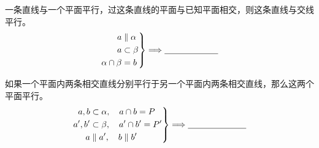 \documentclass{exam-zh}
\begin{document}
\begin{problem}[points=5]
  \noindent
  \begin{minipage}[t]{\dimexpr\linewidth-55mm-6mm\relax}
    \vspace{0pt}
    一条直线与一个平面平行，过这条直线的平面与已知平面相交，则这条直线与交线平行。
\[
\left.
\begin{aligned}
a&\parallel\alpha\\
a&\subset\beta\\
\alpha\cap\beta&=b
\end{aligned}
\right\}
\Longrightarrow
\underline{\hspace{22mm}}
\]


  \end{minipage}\hfill
  \begin{diagramcoltikz}{55mm}{}
  }
  \end{diagramcoltikz}
  \par\medskip
\end{problem}



\begin{problem}[points=5]
  \noindent
  \begin{minipage}[t]{\dimexpr\linewidth-55mm-6mm\relax}
    \vspace{0pt}
    如果一个平面内两条相交直线分别平行于另一个平面内两条相交直线，那么这两个平面平行。
\[
\left.
\begin{aligned}
a,b&\subset\alpha,\quad a\cap b=P\\
a',b'&\subset\beta,\quad a'\cap b'=P'\\
a&\parallel a',\quad b\parallel b'
\end{aligned}
\right\}
\Longrightarrow
\underline{\hspace{24mm}}
\]


  \end{minipage}\hfill
  \begin{diagramcoltikz}{55mm}{}
  }
  \end{diagramcoltikz}
  \par\medskip
\end{problem}


\end{document}
